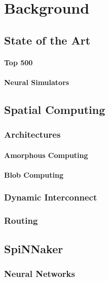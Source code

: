\chapter{Background}
	\label{chap:background}
	
	\section{State of the Art}
	
		\subsubsection{Top 500}
		
		\subsubsection{Neural Simulators}
		
		\section{Spatial Computing}
			
			\subsection{Architectures}
				
				\subsubsection{Amorphous Computing}
				
				\subsubsection{Blob Computing}
			
			\subsection{Dynamic Interconnect}
			
			\subsection{Routing}
	
	\section{SpiNNaker}
		
		\subsection{Neural Networks}
		
